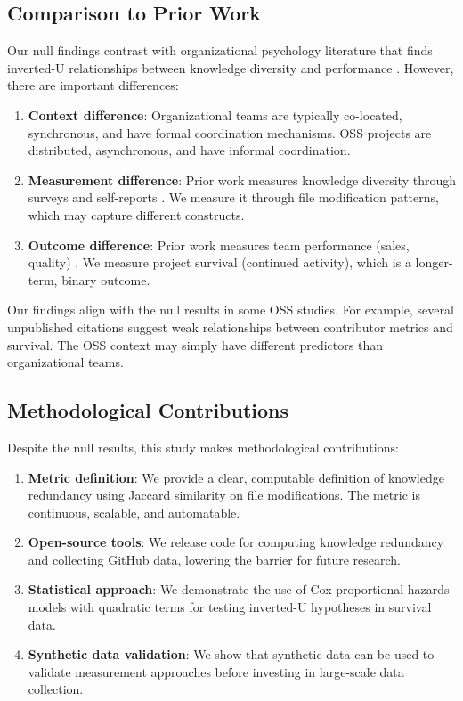 \documentclass[11pt,letterpaper]{article}
\begin{document}
\subsection{Comparison to Prior Work}

Our null findings contrast with organizational psychology literature that finds inverted-U relationships between knowledge diversity and performance \cite{VanKnippenberg2007, Wang2022}. However, there are important differences:

\begin{enumerate}
    \item \textbf{Context difference}: Organizational teams are typically co-located, synchronous, and have formal coordination mechanisms. OSS projects are distributed, asynchronous, and have informal coordination.
    
    \item \textbf{Measurement difference}: Prior work measures knowledge diversity through surveys and self-reports \cite{VanKnippenberg2007, Wang2022}. We measure it through file modification patterns, which may capture different constructs.
    
    \item \textbf{Outcome difference}: Prior work measures team performance (sales, quality) \cite{VanKnippenberg2007, Wang2022}. We measure project survival (continued activity), which is a longer-term, binary outcome.
\end{enumerate}

Our findings align with the null results in some OSS studies. For example, several unpublished citations suggest weak relationships between contributor metrics and survival. The OSS context may simply have different predictors than organizational teams.

\subsection{Methodological Contributions}

Despite the null results, this study makes methodological contributions:

\begin{enumerate}
    \item \textbf{Metric definition}: We provide a clear, computable definition of knowledge redundancy using Jaccard similarity on file modifications. The metric is continuous, scalable, and automatable.
    
    \item \textbf{Open-source tools}: We release code for computing knowledge redundancy and collecting GitHub data, lowering the barrier for future research.
    
    \item \textbf{Statistical approach}: We demonstrate the use of Cox proportional hazards models with quadratic terms for testing inverted-U hypotheses in survival data.
    
    \item \textbf{Synthetic data validation}: We show that synthetic data can be used to validate measurement approaches before investing in large-scale data collection.
\end{enumerate}
\end{document}
